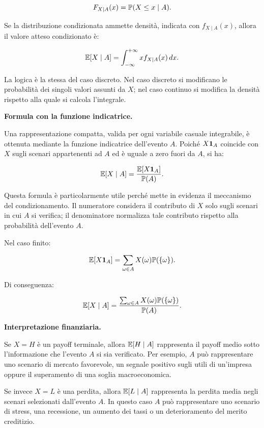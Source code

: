 \[
F_{X\mid A}(x)
=
\mathbb{P}(X\leq x\mid A).
\]

Se la distribuzione condizionata ammette densit\`{a}, indicata con
$f_{X\mid A}(x)$, allora il valore atteso condizionato \`{e}:

\[
\mathbb{E}[X\mid A]
=
\int_{-\infty}^{+\infty}
x f_{X\mid A}(x)\,dx.
\]

La logica \`{e} la stessa del caso discreto. Nel caso discreto si modificano le
probabilit\`{a} dei singoli valori assunti da $X$; nel caso continuo si
modifica la densit\`{a} rispetto alla quale si calcola l'integrale.

\medskip

\noindent
\textbf{Formula con la funzione indicatrice.}

Una rappresentazione compatta, valida per ogni variabile casuale integrabile,
\`{e} ottenuta mediante la funzione indicatrice dell'evento $A$. Poich\'{e}
$X\mathbf{1}_{A}$ coincide con $X$ sugli scenari appartenenti ad $A$ ed
\`{e} uguale a zero fuori da $A$, si ha:

\[
\mathbb{E}[X\mid A]
=
\frac{
\mathbb{E}[X\mathbf{1}_{A}]
}{
\mathbb{P}(A)
}.
\]

Questa formula \`{e} particolarmente utile perch\'{e} mette in evidenza il
meccanismo del condizionamento. Il numeratore considera il contributo di $X$
solo sugli scenari in cui $A$ si verifica; il denominatore normalizza tale
contributo rispetto alla probabilit\`{a} dell'evento $A$.

Nel caso finito:

\[
\mathbb{E}[X\mathbf{1}_{A}]
=
\sum_{\omega\in A}
X(\omega)\mathbb{P}(\{\omega\}).
\]

Di conseguenza:

\[
\mathbb{E}[X\mid A]
=
\frac{
\sum_{\omega\in A}
X(\omega)\mathbb{P}(\{\omega\})
}{
\mathbb{P}(A)
}.
\]

\medskip

\noindent
\textbf{Interpretazione finanziaria.}

Se $X=H$ \`{e} un payoff terminale, allora $ \mathbb{E}[H\mid A] $
rappresenta il payoff medio sotto l'informazione che l'evento $A$ si sia
verificato. Per esempio, $A$ pu\`{o} rappresentare uno scenario di mercato
favorevole, un segnale positivo sugli utili di un'impresa oppure il superamento
di una soglia macroeconomica.

Se invece $X=L$ \`{e} una perdita, allora $ \mathbb{E}[L\mid A] $
rappresenta la perdita media negli scenari selezionati dall'evento $A$. In
questo caso $A$ pu\`{o} rappresentare uno scenario di stress, una recessione,
un aumento dei tassi o un deterioramento del merito creditizio.

